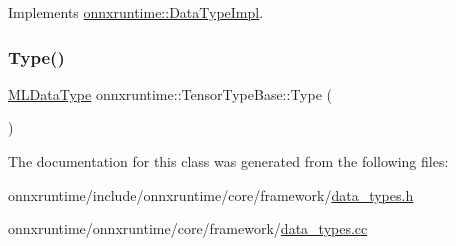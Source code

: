 Implements \mbox{\hyperlink{classonnxruntime_1_1DataTypeImpl_a025f1d860799cd7bc187482742ce7baa}{onnxruntime\+::\+Data\+Type\+Impl}}.

\mbox{\label{classonnxruntime_1_1TensorTypeBase_ac2eca1e5e14e722fc4f764a242059042}} 
\subsubsection{\texorpdfstring{Type()}{Type()}}
{\footnotesize\ttfamily \mbox{\hyperlink{namespaceonnxruntime_ad77d0a6e838ec7da5dc35fed5ee66b49}{M\+L\+Data\+Type}} onnxruntime\+::\+Tensor\+Type\+Base\+::\+Type (\begin{DoxyParamCaption}{ }\end{DoxyParamCaption})\hspace{0.3cm}{\ttfamily [static]}}



The documentation for this class was generated from the following files\+:\begin{DoxyCompactItemize}
\item 
onnxruntime/include/onnxruntime/core/framework/\mbox{\hyperlink{data__types_8h}{data\+\_\+types.\+h}}\item 
onnxruntime/onnxruntime/core/framework/\mbox{\hyperlink{data__types_8cc}{data\+\_\+types.\+cc}}\end{DoxyCompactItemize}
